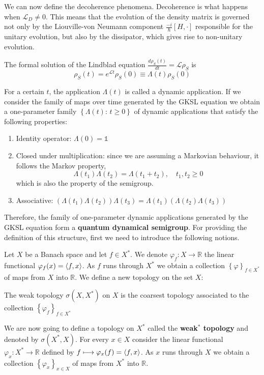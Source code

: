 We can now define the decoherence phenomena. Decoherence is what happens when $\mathcal{L}_D \neq 0$. This means that the evolution of the density matrix is governed not only by the Liouville-von Neumann component $\frac{-i}{\hbar}[H, \cdot]$ responsible for the unitary evolution, but also by the dissipator, which gives rise to non-unitary evolution. 

The formal solution of the Lindblad equation 
$\frac{d \rho_S(t)}{d t} = \mathcal{L}\rho_S$ is $$\rho_S(t) = e^{\mathcal{L}t} \rho_S(0) \equiv \Lambda(t) \rho_S(0) $$

For a certain $t$, the application $\Lambda(t)$ is called a dynamic application. If we consider the family of maps over time generated by the GKSL equation we obtain a one-parameter family $\left\lbrace \Lambda(t) : \, t \geq 0 \right \rbrace$ of dynamic applications that satisfy the following properties:
\begin{enumerate}
    \item Identity operator: $\Lambda(0)=\mathbb{1}$
    \item Closed under multiplication: since we are assuming a Markovian behaviour, it follows the Markov property,
    $$\Lambda(t_1)\Lambda(t_2) = \Lambda(t_1+t_2), \quad t_1, t_2 \geq 0$$
    which is also the property of the semigroup.
    \item Associative: $(\Lambda(t_1)\Lambda(t_2))\Lambda(t_3) = \Lambda(t_1)(\Lambda(t_2)\Lambda(t_3))$
\end{enumerate}

Therefore, the family of one-parameter dynamic applications generated by the GKSL equation form a \textbf{quantum dynamical semigroup}. For providing the definition of this structure, first we need to introduce the following notions.

Let $X$ be a Banach space and let $f \in X^*$. We denote $\varphi_f: X \longrightarrow \mathbb{R}$ the linear functional $\varphi_f(x)=\braket{f,x}$. As $f$ runs through $X^*$ we obtain a collection $\left \lbrace \varphi \right\rbrace_{f \in X^*}$ of maps from $X$ into $\mathbb{R}$. We define a new topology on the set $X$:

\begin{definicion}
    The weak topology $\sigma(X, X^*)$ on $X$ is the coarsest topology associated to the collection $\left \lbrace \varphi_f \right\rbrace_{f \in X^*}$
\end{definicion}

We are now going to define a topology on $X^*$ called the \textbf{weak$^*$ topology} and denoted by $\sigma(X^*,X)$. For every $x\in X$ consider the linear functional $\varphi_x: X^* \longrightarrow \mathbb{R}$ defined by $f \longmapsto \varphi_x(f)=\braket{f,x}$. As $x$ runs through $X$ we obtain a collection $\left\lbrace \varphi _x \right\rbrace_{x\in X}$ of maps from $X^*$ into $\mathbb{R}$.

